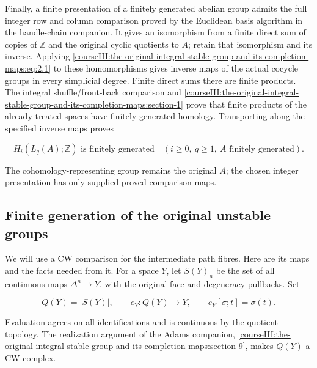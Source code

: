 Finally, a finite presentation of a finitely generated abelian group admits the full integer row and column comparison proved by the Euclidean basis algorithm in the handle-chain companion. It gives an isomorphism from a finite direct sum of copies of \(\mathbb Z\) and the original cyclic quotients to \(A\); retain that isomorphism and its inverse. Applying \eqref{courseIII:the-original-integral-stable-group-and-its-completion-maps:eq:2.1} to these homomorphisms gives inverse maps of the actual cocycle groups in every simplicial degree. Finite direct sums there are finite products. The integral shuffle/front-back comparison and \cref{courseIII:the-original-integral-stable-group-and-its-completion-maps:section-1} prove that finite products of the already treated spaces have finitely generated homology. Transporting along the specified inverse maps proves

\begin{equation}
H_i(L_q(A);\mathbb Z)\text{ is finitely generated}
 \quad(i\geq0,\ q\geq1,\ A\text{ finitely generated}).
 \label{courseIII:the-original-integral-stable-group-and-its-completion-maps:eq:2.6}
\end{equation}

The cohomology-representing group remains the original \(A\); the chosen integer presentation has only supplied proved comparison maps.

\subsection{Finite generation of the original unstable groups}
\label{courseIII:the-original-integral-stable-group-and-its-completion-maps:integral-unstable-finiteness}

\label{courseIII:the-original-integral-stable-group-and-its-completion-maps:section-3}\label{courseIII:integral-stable:3}

We will use a CW comparison for the intermediate path fibres. Here are its maps and the facts needed from it. For a space \(Y\), let \(S(Y)_n\) be the set of all continuous maps \(\Delta^n\to Y\), with the original face and degeneracy pullbacks. Set

\begin{equation}
Q(Y)=|S(Y)|,\qquad e_Y:Q(Y)\longrightarrow Y,
 \qquad e_Y[\sigma;t]=\sigma(t).
 \label{courseIII:the-original-integral-stable-group-and-its-completion-maps:eq:3.1}
\end{equation}

Evaluation agrees on all identifications and is continuous by the quotient topology. The realization argument of the Adams companion, \cref{courseIII:the-original-integral-stable-group-and-its-completion-maps:section-9}, makes \(Q(Y)\) a CW complex.

